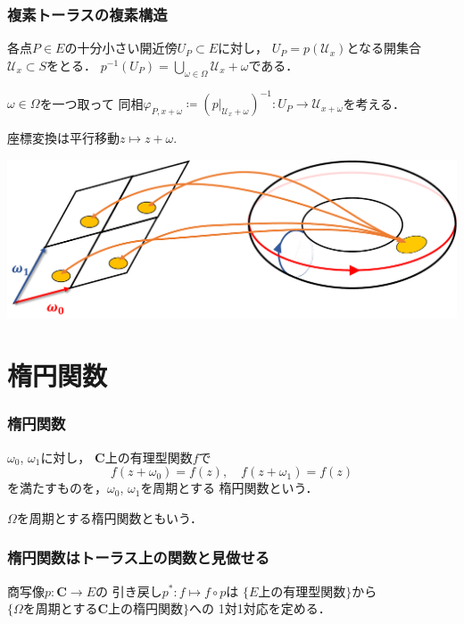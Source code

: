 \documentclass[dvipdfmx,12pt,aspectratio=169]{beamer}%
\newcommand{\cc}{\mathbf{C}}
\newcommand{\mcal}{\mathcal}
\newcommand{\dip}{\displaystyle} %
\newcommand{\pphi}{\varphi} %
\newcommand{\UU}{\mcal{U}}
\newcommand{\mapres}[2]{\left. #1 \right|_{#2}}
\begin{document}
\begin{frame}
    \frametitle{複素トーラスの複素構造}
        各点$P\in E$の十分小さい開近傍$U_P\subset E$に対し，
        $U_P=p(\UU_x)$となる開集合$\UU_x\subset S$をとる．
        $\dip p^{-1}(U_P)=\bigcup_{\omega\in\Omega}\UU_x+\omega$である．

        $\omega\in\Omega$を一つ取って
        同相$\pphi_{P,x+\omega}\coloneqq
        \left(\mapres{p}{\UU_x+\omega}\right)^{-1}\colon 
        U_P\to\UU_{x+\omega}$を考える．

        座標変換は平行移動$z\mapsto z+\omega$.


        \includegraphics[width=0.7\hsize]{fig/atlas.pdf}
        \centering
\end{frame}

\section{楕円関数}

\begin{frame}
    \frametitle{楕円関数}

    \begin{Definition}
        $\omega_0$, $\omega_1$に対し，
        $\cc$上の有理型関数$f$で
        \begin{equation*}
            f(z+\omega_0)=f(z),\quad f(z+\omega_1)=f(z)
        \end{equation*}
        を満たすものを，$\omega_0$, $\omega_1$を周期とする
        楕円関数という．
    \end{Definition}

    $\Omega$を周期とする楕円関数ともいう．
\end{frame}

\begin{frame}
    \frametitle{楕円関数はトーラス上の関数と見做せる}

    \begin{Lemma}\label{lem:corr}
        商写像$p\colon\cc\to E$の
        引き戻し$p^{\ast}\colon f\mapsto f\circ p$は
        $\{E\text{上の有理型関数}\}$から
        $\{\Omega\text{を周期とする}\cc\text{上の楕円関数}\}$への
        1対1対応を定める．
    \end{Lemma}
\end{frame}
\end{document}
